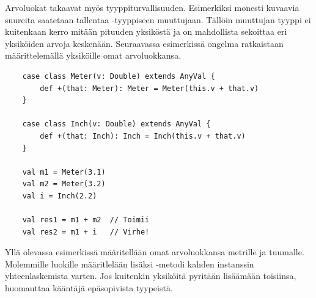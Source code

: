 Arvoluokat takaavat myös tyyppiturvallisuuden. Esimerkiksi monesti kuvaavia suureita saatetaan tallentaa  -tyyppiseen muuttujaan. Tällöin muuttujan tyyppi ei kuitenkaan kerro mitään pituuden yksiköstä ja on mahdollista sekoittaa eri yksiköiden arvoja keskenään. Seuraavassa esimerkissä ongelma ratkaistaan määrittelemällä yksiköille omat arvoluokkansa. 
\begin{lstlisting}
    case class Meter(v: Double) extends AnyVal {
        def +(that: Meter): Meter = Meter(this.v + that.v)
    }
    
    case class Inch(v: Double) extends AnyVal {
        def +(that: Inch): Inch = Inch(this.v + that.v)
    }

    val m1 = Meter(3.1)
    val m2 = Meter(3.2)
    val i = Inch(2.2)

    val res1 = m1 + m2  // Toimii
    val res2 = m1 + i   // Virhe!
\end{lstlisting}
Yllä olevassa esimerkissä määritellään omat arvoluokkansa metrille ja tuumalle. Molemmille luokille määritlelään lisäksi \code{+}-metodi kahden instanssin yhteenlaskemista varten. Jos kuitenkin yksiköitä pyritään lisäämään toisiinsa, huomauttaa kääntäjä epäsopivista tyypeistä.
\cite[Luku 11]{prorgrammingInScala3rd}
